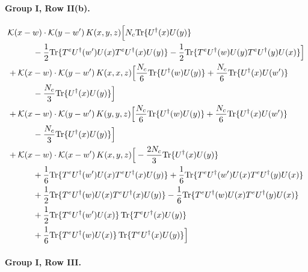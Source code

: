 \documentclass[10pt]{article}
\numberwithin{equation}{section}
\begin{document}
\paragraph{Group I, Row II(b).}

\begin{align}
&\mathcal K(x-w)\cdot\mathcal K(y-w')\,K(x,y,z)\Big[N_c{\rm Tr}\{U^\dagger(x)U(y)\}\notag\\
&\quad\quad\quad-\frac{1}{2}{\rm Tr}\{T^eU^\dagger(w')U(x)T^eU^\dagger(x)U(y)\}-\frac{1}{2}{\rm Tr}\{T^eU^\dagger(w)U(y)T^eU^\dagger(y)U(x)\}\Big]\notag\\
&+\mathcal K(x-w)\cdot\mathcal K(y-w')\,K(x,x,z)\Big[\frac{N_c}{6}{\rm Tr}\{U^\dagger(w)U(y)\}+\frac{N_c}{6}{\rm Tr}\{U^\dagger(x)U(w')\}\notag\\
&\quad\quad\quad-\frac{N_c}{3}{\rm Tr}\{U^\dagger(x)U(y)\}\Big]\notag\\
&+\mathcal K(x-w)\cdot\mathcal K(y-w')\,K(y,y,z)\Big[\frac{N_c}{6}{\rm Tr}\{U^\dagger(w)U(y)\}+\frac{N_c}{6}{\rm Tr}\{U^\dagger(x)U(w')\}\notag\\
&\quad\quad\quad-\frac{N_c}{3}{\rm Tr}\{U^\dagger(x)U(y)\}\Big]\notag\\
&+\mathcal K(x-w)\cdot\mathcal K(x-w')\,K(x,y,z)\Big[-\frac{2 N_c}{3}{\rm Tr}\{U^\dagger(x)U(y)\}\notag\\
&\quad\quad\quad+\frac{1}{6}{\rm Tr}\{T^eU^\dagger(w')U(x)T^eU^\dagger(x)U(y)\}+\frac{1}{6}{\rm Tr}\{T^eU^\dagger(w')U(x)T^eU^\dagger(y)U(x)\}\notag\\
&\quad\quad\quad+\frac{1}{2}{\rm Tr}\{T^eU^\dagger(w)U(x)T^eU^\dagger(x)U(y)\}-\frac{1}{6}{\rm Tr}\{T^eU^\dagger(w)U(x)T^eU^\dagger(y)U(x)\}\notag\\
&\quad\quad\quad+\frac{1}{2}{\rm Tr}\{T^eU^\dagger(w')U(x)\}\,{\rm Tr}\{T^eU^\dagger(x)U(y)\}\notag\\
&\quad\quad\quad+\frac{1}{6}{\rm Tr}\{T^eU^\dagger(w)U(x)\}\,{\rm Tr}\{T^eU^\dagger(x)U(y)\}\Big]
\label{eq:G1IIb}
\end{align}

\paragraph{Group I, Row III.}
\end{document}
